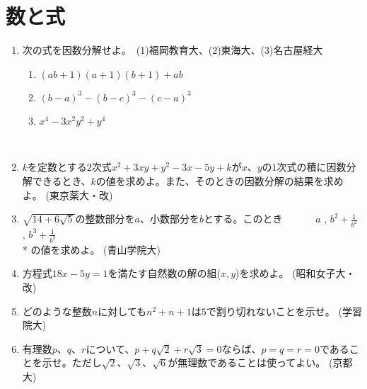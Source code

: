\documentclass[10pt,a4paper,fleqn]{jsarticle}
\begin{document}
\section{数と式}
\begin{enumerate}
\item 次の式を因数分解せよ。　(1)福岡教育大、(2)東海大、(3)名古屋経大
\begin{enumerate}[(1)]
\item $(ab+1)(a+1)(b+1)+ab$
\item $(b-a)^3-(b-c)^3-(c-a)^3$
\item $x^4-3x^2y^2+y^4$
\end{enumerate}\

\item $k$を定数とする$2$次式$x^2+3xy+y^2-3x-5y+k$が$x$、$y$の$1$次式の積に因数分解できるとき、$k$の値を求めよ。また、そのときの因数分解の結果を求めよ。 (東京薬大・改)\newline

\item $\displaystyle\sqrt{14+6\sqrt{5}}$の整数部分を$a$、小数部分を$b$とする。このとき \newline ~~~~~~$a$ ,  $b^2+\displaystyle\frac{1}{b^2}$ ,  $b^3+\displaystyle\frac{1}{b^3}$ \\* の値を求めよ。 (青山学院大)\newline

\item 方程式$18x-5y=1$を満たす自然数の解の組($x,y$)を求めよ。 (昭和女子大・改)\newline

\item どのような整数$n$に対しても$n^2+n+1$は$5$で割り切れないことを示せ。 (学習院大)\newline

\item 有理数$p、q、r$について、$p+q\sqrt{2}+r\sqrt{3}=0$ならば、$p=q=r=0$であることを示せ。ただし$\sqrt{2}、\sqrt{3}、\sqrt{6}$が無理数であることは使ってよい。 (京都大)\newline

\end{enumerate}
\end{document}
